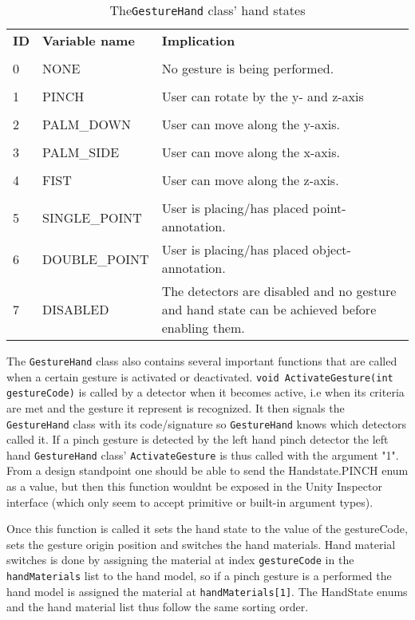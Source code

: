 \begin{table}[]
\centering
\label{tab:handstates}
\begin{tabular}{p{1cm}| p{3.5cm} | p{6cm}}
	\textbf{ID} &  \textbf{Variable name} &   \textbf{Implication} \\\\
	0 & NONE & No gesture is being performed. \\\\
	1 & PINCH & User can rotate by the y- and z-axis \\\\
	2 & PALM\_DOWN & User can move along the y-axis.  \\\\
	3 & PALM\_SIDE & User can move along the x-axis.  \\\\
	4 & FIST & User can move along the z-axis.  \\\\
	5 & SINGLE\_POINT & User is placing/has placed point-annotation.  \\
	6 & DOUBLE\_POINT & User is placing/has placed object-annotation.  \\
	7 & DISABLED & The detectors are disabled and no gesture and hand state can be achieved before enabling them.  
\end{tabular}
\caption{The\texttt{GestureHand} class' hand states}
\end{table}

The \texttt{GestureHand} class also contains several important functions that are called when a certain gesture is activated or deactivated.
\texttt{void ActivateGesture(int gestureCode)} is called by a detector when it becomes active, i.e when its criteria are met and the gesture it represent is recognized.
It then signals the \texttt{GestureHand} class with its code/signature so \texttt{GestureHand} knows which detectors called it.
If a pinch gesture is detected by the left hand pinch detector the left hand \texttt{GestureHand} class' \texttt{ActivateGesture} is thus called with the argument "1".
From a design standpoint one should be able to send the Handstate.PINCH enum as a value, but then this function wouldnt be exposed in the Unity Inspector interface (which
only seem to accept primitive or built-in argument types). 

Once this function is called it sets the hand state to the value of the gestureCode, sets the gesture origin position and switches the hand materials.
Hand material switches is done by assigning the material at index \texttt{gestureCode} in the \texttt{handMaterials} list to the hand model, so 
if a pinch gesture is a performed the hand model is assigned the material at \texttt{handMaterials[1]}. The HandState enums and the hand material list thus 
follow the same sorting order. 

